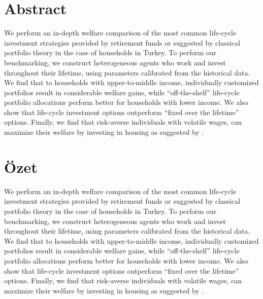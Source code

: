 \chapter*{Abstract}
\ttitle

\vspace{20pt}
We perform an in-depth welfare comparison of the most common life-cycle investment strategies provided by retirement funds or suggested by classical portfolio theory in the case of households in Turkey. To perform our benchmarking, we construct heterogeneous agents who work and invest throughout their lifetime, using parameters calibrated from the historical data. We find that to households with upper-to-middle income, individually customized portfolios result in considerable welfare gains, while ``off-the-shelf'' life-cycle portfolio allocations perform better for households with lower income. We also show that life-cycle investment options outperform ``fixed over the lifetime'' options. Finally, we find that risk-averse individuals with volatile wages, can maximize their welfare by investing in housing as suggested by \citet{munk}.
\newpage

\chapter*{Özet}

\ttitletr

\vspace{20pt}
 
We perform an in-depth welfare comparison of the most common life-cycle investment strategies provided by retirement funds or suggested by classical portfolio theory in the case of households in Turkey. To perform our benchmarking, we construct heterogeneous agents who work and invest throughout their lifetime, using parameters calibrated from the historical data. We find that to households with upper-to-middle income, individually customized portfolios result in considerable welfare gains, while ``off-the-shelf'' life-cycle portfolio allocations perform better for households with lower income. We also show that life-cycle investment options outperform ``fixed over the lifetime'' options. Finally, we find that risk-averse individuals with volatile wages, can maximize their welfare by investing in housing as suggested by \citet{munk}.
